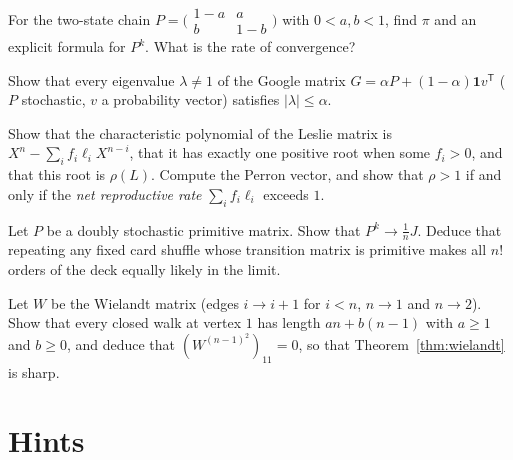 \begin{exercise}[$\star$]\label{ex:twostate}
For the two-state chain $P=\bigl(\begin{smallmatrix}1-a&a\\b&1-b\end{smallmatrix}\bigr)$ with $0<a,b<1$, find $\pi$ and an
explicit formula for $P^k$. What is the rate of convergence?
\end{exercise}

\begin{exercise}[$\star\star$]\label{ex:pagerankrate}
Show that every eigenvalue $\lambda\ne1$ of the Google matrix $G=\alpha P+(1-\alpha)\mathbf 1v^{\mathsf T}$ ($P$ stochastic, $v$ a
probability vector) satisfies $|\lambda|\le\alpha$.
\end{exercise}

\begin{exercise}[$\star\star$]\label{ex:leslie}
Show that the characteristic polynomial of the Leslie matrix is $X^n-\sum_if_i\ell_iX^{n-i}$, that it has exactly one
positive root when some $f_i>0$, and that this root is $\rho(L)$. Compute the Perron vector, and show that $\rho>1$ if and only
if the \emph{net reproductive rate} $\sum_if_i\ell_i$ exceeds $1$.
\end{exercise}

\begin{exercise}[$\star\star$]\label{ex:doublystoch}
Let $P$ be a doubly stochastic primitive matrix. Show that $P^k\to\frac1nJ$. Deduce that repeating any fixed card shuffle
whose transition matrix is primitive makes all $n!$ orders of the deck equally likely in the limit.
\end{exercise}

\begin{exercise}[$\star\star\star$]\label{ex:wielandtsharp}
Let $W$ be the Wielandt matrix (edges $i\to i+1$ for $i<n$, $n\to1$ and $n\to2$). Show that every closed walk at vertex $1$
has length $an+b(n-1)$ with $a\ge1$ and $b\ge0$, and deduce that $(W^{(n-1)^2})_{11}=0$, so that Theorem~\ref{thm:wielandt} is
sharp.
\end{exercise}

\section{Hints}

